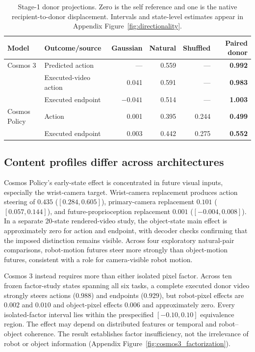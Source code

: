 \begin{table}[t]
  \caption{Stage-1 donor projections. Zero is the self reference and one is the native recipient-to-donor displacement. Intervals and state-level estimates appear in Appendix Figure~\ref{fig:directionality}.}
  \label{tab:directionality_short}
  \centering
  \scriptsize
  \setlength{\tabcolsep}{4.2pt}
  \begin{tabular}{@{}llrrrr@{}}
    \toprule
    Model & Outcome/source & Gaussian & Natural & Shuffled & Paired donor \\
    \midrule
    Cosmos 3 & Predicted action & --- & 0.559 & --- & \textbf{0.992} \\
             & Executed-video action & 0.041 & 0.591 & --- & \textbf{0.983} \\
             & Executed endpoint & $-0.041$ & 0.514 & --- & \textbf{1.003} \\
    \midrule
    Cosmos Policy & Action & 0.001 & 0.395 & 0.244 & \textbf{0.499} \\
                  & Executed endpoint & 0.003 & 0.442 & 0.275 & \textbf{0.552} \\
    \bottomrule
  \end{tabular}
\end{table}

\subsection{Content profiles differ across architectures}
\label{sec:content}

Cosmos Policy's early-state effect is concentrated in future visual inputs, especially the wrist-camera target. Wrist-camera replacement produces action steering of $0.435$ ($[0.284,0.605]$), primary-camera replacement $0.101$ ($[0.057,0.144]$), and future-proprioception replacement $0.001$ ($[-0.004,0.008]$). In a separate 20-state rendered-video study, the object-state main effect is approximately zero for action and endpoint, with decoder checks confirming that the imposed distinction remains visible. Across four exploratory natural-pair comparisons, robot-motion futures steer more strongly than object-motion futures, consistent with a role for camera-visible robot motion.

Cosmos 3 instead requires more than either isolated pixel factor. Across ten frozen factor-study states spanning all six tasks, a complete executed donor video strongly steers actions ($0.988$) and endpoints ($0.929$), but robot-pixel effects are $0.002$ and $0.010$ and object-pixel effects $0.006$ and approximately zero. Every isolated-factor interval lies within the prespecified $[-0.10,0.10]$ equivalence region. The effect may depend on distributed features or temporal and robot--object coherence. The result establishes factor insufficiency, not the irrelevance of robot or object information (Appendix Figure~\ref{fig:cosmos3_factorization}).


